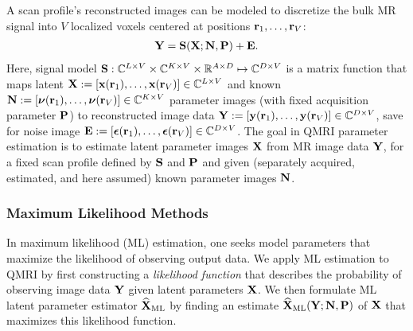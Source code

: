 A scan profile's reconstructed images
can be modeled 
to discretize the bulk MR signal 
into $V$ localized voxels
centered at positions $\mathbf{r}_1,\dots,\mathbf{r}_V$:
\begin{align}
	\bmY = \bmS\paren{\bmX; \bmN, \bmP} + \bmE.
	\label{eq:relax,mod-mtx}
\end{align}
Here, signal model
$\mathbf{S} : \mathbb{C}^{L\times V} \times \mathbb{C}^{K\times V}
\times \mathbb{R}^{A \times D} \mapsto \mathbb{C}^{D \times V}$ 
is a matrix function
that maps latent 
$\bmX := \brac{\bmx\paren{\bmr_1},\dots,\bmx\paren{\bmr_V}} 
\in \complexes{L\times V}$
and known 
$\bmN := \brac{\bmnu\paren{\bmr_1},\dots,\bmnu\paren{\bmr_V}} 
\in \complexes{K\times V}$
parameter images 
(with fixed acquisition parameter $\mathbf{P}$)
to reconstructed image data
$\bmY := \brac{\bmy\paren{\bmr_1},\dots,\bmy\paren{\bmr_V}} 
\in \complexes{D\times V}$,
save for noise image
$\bmE := \brac{\bmeps\paren{\bmr_1},\dots,\bmeps\paren{\bmr_V}} 
\in \complexes{D\times V}$. 
The goal in QMRI parameter estimation
is to estimate latent parameter images $\mathbf{X}$ 
from MR image data $\mathbf{Y}$,
for a fixed scan profile defined by $\mathbf{S}$ and $\mathbf{P}$
and given (separately acquired, estimated, and here assumed)
known parameter images $\mathbf{N}$.

\subsubsection{Maximum Likelihood Methods}
\label{sss,relax,meth,est,ml}

In maximum likelihood (ML) estimation,
one seeks model parameters
that maximize the likelihood
of observing output data.
We apply ML estimation to QMRI
by first constructing 
a \emph{likelihood function}
that describes the probability 
of observing image data $\mathbf{Y}$
given latent parameters $\mathbf{X}$.
We then formulate 
ML latent parameter estimator $\widehat{\mathbf{X}}_\mathrm{ML}$
by finding an estimate $\estaML{\bmX}{\bmY; \bmN, \bmP}$ 
of $\mathbf{X}$
that maximizes this likelihood function. 

